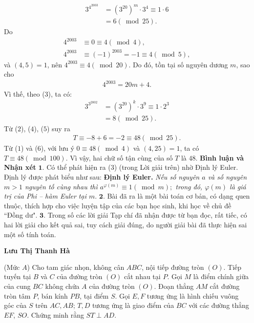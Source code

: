 \begin{multicols}{2}
\begin{align*}
		{3^{{4^{2003}}}} &= {\left( {{3^{20}}} \right)^m} \cdot {3^4} \equiv 1 \cdot 6 \\
		&= 6\left( {\bmod 25} \right). \tag{$4$}
	\end{align*}
	Do
	\begin{align*}
		{4^{2003}} &\equiv 0 \equiv 4\left( {\bmod 4} \right),\\
		{4^{2003}} &\equiv {\left( { - 1} \right)^{2003}} =  - 1 \equiv 4\left( {\bmod 5} \right),
	\end{align*}
	và $(4, 5) = 1$, nên ${4^{2003}} \equiv 4\left( {\bmod 20} \right)$.  Do đó, tồn tại số nguyên dương $m$, sao cho
	\begin{align*}
		{4^{2003}} = 20m + 4.
	\end{align*}
	Vì thế, theo ($3$), ta có:
	\begin{align*}
		{3^{{3^{2002}}}} &= {\left( {{3^{20}}} \right)^k} \cdot {3^9} \equiv 1 \cdot 2^3 \\
		&= 8\left({\bmod 25} \right). \tag{$5$}
	\end{align*}
	Từ ($2$), ($4$), ($5$) suy ra
	\begin{align*}
		T \equiv  - 8 + 6 =  - 2 \equiv 48\left( {\bmod 25} \right). \tag{$6$}
	\end{align*}
	Từ ($1$) và ($6$), với lưu ý $0 \equiv 48\left( {\bmod 4} \right)$ và $(4, 25) = 1$, ta có  $T \equiv 48\left( {\bmod 100} \right)$.
	\vskip 0.05cm
	Vì vậy, hai chữ số tận cùng của số $T$ là $48$.
	\vskip 0.05cm
	\textbf{\color{thachthuctoanhoc}Bình luận và Nhận xét}
	\vskip 0.05cm
	$\pmb{1.}$ Có thể phát hiện ra ($3$) (trong Lời giải trên) nhờ Định lý Euler. Định lý được phát biểu như sau:
	\vskip 0.05cm
	\textbf{\color{thachthuctoanhoc}Định lý Euler.} \textit{Nếu số nguyên $a$ và số nguyên $m > 1$ nguyên tố cùng nhau thì  ${a^{\varphi \left( m \right)}} \equiv 1\left( {\bmod m} \right);$ trong đó, $\varphi \left( m \right)$  là giá trị của Phi -- hàm Euler tại $m$}.
	\vskip 0.05cm
	$\pmb{2.}$ Bài đã ra là một bài toán cơ bản, có dạng quen thuộc, thích hợp cho việc luyện tập của các bạn học sinh, khi học về chủ đề ``Đồng dư".
	\vskip 0.05cm
	$\pmb{3.}$ Trong số các lời giải Tạp chí đã nhận được từ bạn đọc, rất tiếc, có hai lời giải cho kết quả sai, tuy cách giải đúng, do người giải bài đã thực hiện sai một số tính toán.
	\begin{flushright}
		\textbf{\color{thachthuctoanhoc}Lưu Thị Thanh Hà}
	\end{flushright}
	{}
	(Mức $A$) Cho tam giác nhọn, không cân $A B C$, nội tiếp đường tròn $(O)$. Tiếp tuyến tại $B$ và $C$ của đường tròn $(O)$ cắt nhau tại $P$. Gọi $M$ là điểm chính giữa của cung $B C$ không chứa $A$ của đường tròn $(O)$. Đoạn thẳng $A M$ cắt đường tròn tâm $P$, bán kính $P B$, tại điểm $S$. Gọi $E, F$ tương ứng là hình chiếu vuông góc của $S$ trên $A C, A B$; $T, D$ tương ứng là giao điểm của $B C$ với các đường thẳng $E F$, $SO$.  Chứng minh rằng $ST \perp A D$.

\end{multicols}
